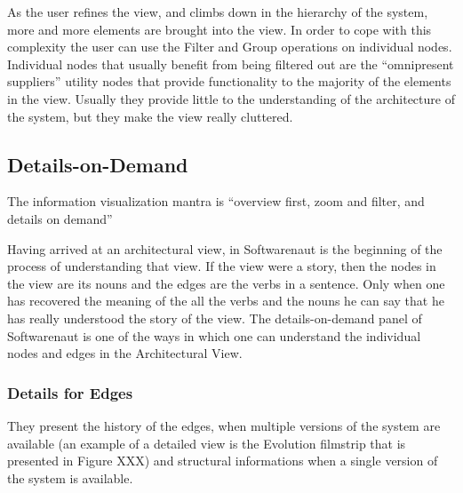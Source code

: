 \documentclass[preprint,12pt]{elsarticle}
\begin{document}
As the user refines the view, and climbs down in the hierarchy of the system, more and more elements are brought into the view. In order to cope with this complexity the user can use the Filter and Group operations on individual nodes. Individual nodes that usually benefit from being filtered out are the “omnipresent suppliers” utility nodes that provide functionality to the majority of the elements in the view. Usually they provide little to the understanding of the architecture of the system, but they make the view really cluttered. 


\newpage
\subsection {Details-on-Demand}

The information visualization mantra is “overview first, zoom and filter, and details on demand” 

Having arrived at an architectural view, in Softwarenaut is the beginning of the process of understanding that view. If the view were a story, then the nodes in the view are its nouns and the edges are the verbs in a sentence. Only when one has recovered the meaning of the all the verbs and the nouns he can say that he has really understood the story of the view. The details-on-demand panel of Softwarenaut is one of the ways in which one can understand the individual nodes and edges in the Architectural View.


\subsubsection {Details for Edges}
They present the history of the edges, when multiple versions of the system are available (an example of a detailed view is the Evolution filmstrip \cite{lungu-relevo} that is presented in Figure XXX) and structural informations when a single version of the system is available. 
\end{document}
